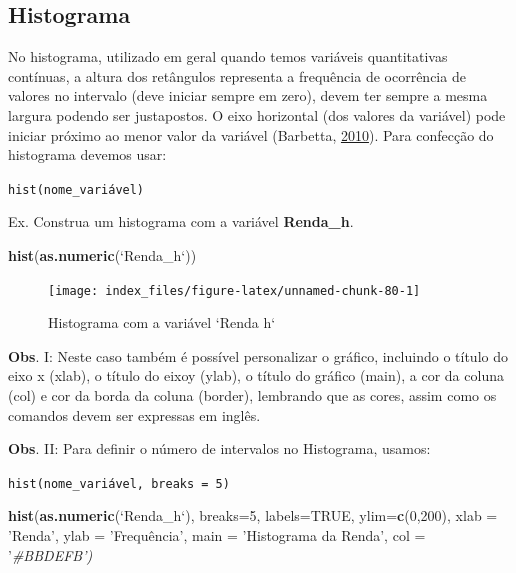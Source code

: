 \documentclass[12pt,brazil,oneside]{book}
\newenvironment{Shaded}{\begin{snugshade}}{\end{snugshade}}
\newcommand{\CommentTok}[1]{\textcolor[rgb]{0.56,0.35,0.01}{\textit{#1}}}
\newcommand{\DataTypeTok}[1]{\textcolor[rgb]{0.13,0.29,0.53}{#1}}
\newcommand{\DecValTok}[1]{\textcolor[rgb]{0.00,0.00,0.81}{#1}}
\newcommand{\KeywordTok}[1]{\textcolor[rgb]{0.13,0.29,0.53}{\textbf{#1}}}
\newcommand{\NormalTok}[1]{#1}
\newcommand{\OtherTok}[1]{\textcolor[rgb]{0.56,0.35,0.01}{#1}}
\newcommand{\StringTok}[1]{\textcolor[rgb]{0.31,0.60,0.02}{#1}}
\begin{document}
\hypertarget{histograma}{%
\subsection{Histograma}\label{histograma}}

No histograma, utilizado em geral quando temos variáveis quantitativas contínuas, a altura dos retângulos representa a frequência de ocorrência de valores no intervalo (deve iniciar sempre em zero), devem ter sempre a mesma largura podendo ser justapostos. O eixo horizontal (dos valores da variável) pode iniciar próximo ao menor valor da variável (Barbetta, \protect\hyperlink{ref-barbetta1988}{2010}). Para confecção do histograma devemos usar:

\texttt{hist(nome\_variável)}

Ex. Construa um histograma com a variável \textbf{Renda\_h}.

\begin{Shaded}
\begin{Highlighting}[]
\KeywordTok{hist}\NormalTok{(}\KeywordTok{as.numeric}\NormalTok{(}\StringTok{`}\DataTypeTok{Renda_h}\StringTok{`}\NormalTok{))}
\end{Highlighting}
\end{Shaded}

\begin{figure}[H]

{\centering \texttt{[image: index\_files/figure-latex/unnamed-chunk-80-1]} 

}

\caption{Histograma com a variável `Renda h`}\label{fig:unnamed-chunk-80}
\end{figure}

\textbf{Obs}. I: Neste caso também é possível personalizar o gráfico, incluindo o título do eixo x (xlab), o título do eixoy (ylab), o título do gráfico (main), a cor da coluna (col) e cor da borda da coluna (border), lembrando que as cores, assim como os comandos devem ser expressas em inglês.

\textbf{Obs}. II: Para definir o número de intervalos no Histograma, usamos:

\texttt{hist(nome\_variável,\ breaks\ =\ 5)}

\begin{Shaded}
\begin{Highlighting}[]
\KeywordTok{hist}\NormalTok{(}\KeywordTok{as.numeric}\NormalTok{(}\StringTok{`}\DataTypeTok{Renda_h}\StringTok{`}\NormalTok{), }
     \DataTypeTok{breaks=}\DecValTok{5}\NormalTok{, }
     \DataTypeTok{labels=}\OtherTok{TRUE}\NormalTok{, }
     \DataTypeTok{ylim=}\KeywordTok{c}\NormalTok{(}\DecValTok{0}\NormalTok{,}\DecValTok{200}\NormalTok{), }
     \DataTypeTok{xlab =} \StringTok{'Renda'}\NormalTok{,}
     \DataTypeTok{ylab =} \StringTok{'Frequência',}
\StringTok{     main = '}\NormalTok{Histograma da Renda}\StringTok{',}
\StringTok{     col = '}\CommentTok{#BBDEFB')}
\end{Highlighting}
\end{Shaded}
\end{document}
